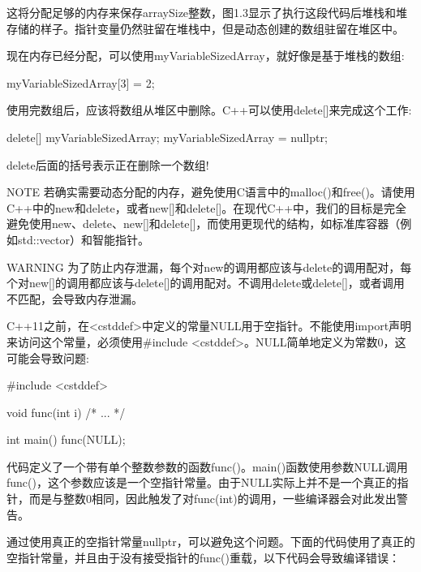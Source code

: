 这将分配足够的内存来保存arraySize整数，图1.3显示了执行这段代码后堆栈和堆存储的样子。指针变量仍然驻留在堆栈中，但是动态创建的数组驻留在堆区中。


现在内存已经分配，可以使用myVariableSizedArray，就好像是基于堆栈的数组:

\begin{cpp}
myVariableSizedArray[3] = 2;
\end{cpp}

使用完数组后，应该将数组从堆区中删除。C++可以使用delete[]来完成这个工作:

\begin{cpp}
delete[] myVariableSizedArray;
myVariableSizedArray = nullptr;
\end{cpp}

delete后面的括号表示正在删除一个数组!

\begin{myNotic}{NOTE}
若确实需要动态分配的内存，避免使用C语言中的malloc()和free()。请使用C++中的new和delete，或者new[]和delete[]。在现代C++中，我们的目标是完全避免使用new、delete、new[]和delete[]，而使用更现代的结构，如标准库容器（例如std::vector）和智能指针。
\end{myNotic}

\begin{myWarning}{WARNING}
为了防止内存泄漏，每个对new的调用都应该与delete的调用配对，每个对new[]的调用都应该与delete[]的调用配对。不调用delete或delete[]，或者调用不匹配，会导致内存泄漏。
\end{myWarning}


C++11之前，在<cstddef>中定义的常量NULL用于空指针。不能使用import声明来访问这个常量，必须使用\#include <cstddef>。NULL简单地定义为常数0，这可能会导致问题:

\begin{cpp}
#include <cstddef>

void func(int i) { /* ... */ }

int main()
{
    func(NULL);
}
\end{cpp}

代码定义了一个带有单个整数参数的函数func()。main()函数使用参数NULL调用func()，这个参数应该是一个空指针常量。由于NULL实际上并不是一个真正的指针，而是与整数0相同，因此触发了对func(int)的调用，一些编译器会对此发出警告。

通过使用真正的空指针常量nullptr，可以避免这个问题。下面的代码使用了真正的空指针常量，并且由于没有接受指针的func()重载，以下代码会导致编译错误：

